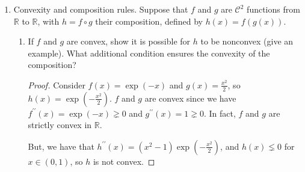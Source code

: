 \documentclass[11pt]{amsart}
\newcommand{\cC}{\mathcal{C}}
\begin{document}
\begin{enumerate}
\begin{enumerate}
\item Any norm (see Chapter 1 for definition of a norm).

  \begin{proof}
    Let $\lVert \cdot \rVert$ be a norm, meaning that it satisfies
    \emph{absolute homogeneity} and the \emph{triangle inequality}. We have that
    \begin{align*}
      \lVert \lambda x + (1 - \lambda)y \rVert
      &\leq \lVert \lambda x \rVert + \lVert (1 - \lambda)y \rVert
      = \lambda \lVert x \rVert + (1 - \lambda)\lVert y \rVert
    \end{align*}
    for all $\lambda \in [0, 1]$, where we first apply the triangle inequality
    and then absolute homogeneity. By defintion, $\lVert \cdot \rVert$ is convex.
  \end{proof}

\end{enumerate}

\bigskip\bigskip




\item  Convexity and composition rules. Suppose that $f$ and $g$ are $\cC^2$ functions from $\mathbb{R}$ to $\mathbb{R}$, with $h = f\circ g$ their composition, defined by 
\(
h(x) = f(g(x)).
\) 
\begin{enumerate}
\item If $f$ and $g$ are convex, show it is possible for $h$ to be nonconvex (give an example). What additional condition ensures 
  the convexity of the composition?

  \begin{proof}
    Consider $f(x) = \exp(-x)$ and $g(x) = \frac{x^2}{2}$, so
    $h(x) = \exp\left(-\frac{x^2}{2}\right)$. $f$ and $g$ are convex since we
    have $f^{\prime\prime}(x) = \exp(-x) \gneq 0$ and
    $g^{\prime\prime}(x) = 1 \gneq 0$. In fact, $f$ and $g$ are strictly convex
    in $\mathbb{R}$.

    But, we have that
    $h^{\prime\prime}(x) = \left(x^2 - 1\right)\exp\left(-\frac{x^2}{2}\right)$,
    and $h(x) \lneq 0$ for $x \in (0, 1)$, so $h$ is not convex.
  \end{proof}


\end{enumerate}
\end{enumerate}
\end{document}
